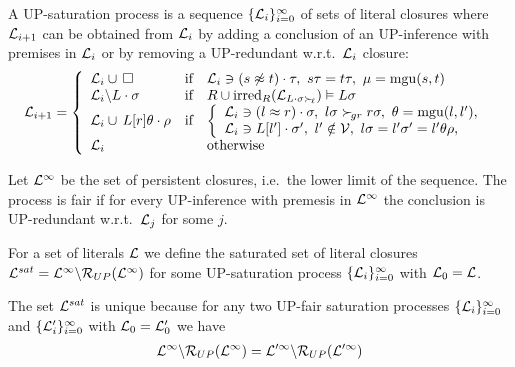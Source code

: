 \begin{definition}
    A UP-{\myem saturation process} is
    a sequence \( \{ \mathcal{L}_i \}_{i=0}^\infty \)
    of sets of literal closures where
    \( \mathcal{L}_{i+1} \) can be obtained from
    \( \mathcal{L}_i \)
    by {\myem adding} a conclusion of an UP-inference with premises in $\mathcal{L}_i$
    or by {\myem removing} a UP-redundant w.r.t.~\(\mathcal{L}_i\) closure:
    \begin{gather*}
        \mathcal{L}_{i+1} = \left\{
            \begin{array}{lclc}
                \mathcal{L}_i \cup\,\square
                &\text{if}
                &
                    \mathcal{L}_i\ni(s\not\approx t)\cdot\tau,\ {}
                    s\tau = t\tau,\ {}
                    \mu=\operatorname{mgu}(s,t)
                \\
                \mathcal{L}_i \backslash L\cdot\sigma
                &\text{if}
                &R \cup \operatorname{irred}_R(\mathcal{L}_{L\cdot\sigma\mathrel\succ_{\!\ell}}) \vDash L\sigma
                \\
                \mathcal{L}_i \cup\, L[r]\theta\cdot\rho
                &\text{if}
                &\left\{\begin{array}{l}
                    \mathcal{L}_i\ni(l\approx r)\cdot\sigma,\ {}
                    l\sigma\mathrel\succ_{\!gr} r\sigma,\ {}
                    \theta=\operatorname{mgu}(l,l'),
                    \\
                    \mathcal{L}_i\ni L[l']\cdot\sigma',\ {}
                    l'\notin\mathcal{V},\ {}
                    l\sigma = l'\sigma' = l'\theta\rho,
                \end{array}\right.
                \\
                \mathcal{L}_i
                &&\text{otherwise}
            \end{array}
        \right.
    \end{gather*}

    Let \( \mathcal{L}^\infty \) be the set of persistent closures,
    i.e.~the lower limit of the sequence.
    The process is {\myem fair} if for every UP-inference
    with premesis in \( \mathcal{L}^\infty \) the conclusion is UP-redundant
    w.r.t.~\(\mathcal{L}_j\) for some \(j\).

    For a set of literals \( \mathcal{L} \) we define
    the saturated set of literal closures
    \( \mathcal{L}^{sat} = \mathcal{L}^\infty\backslash\mathcal{R}_{UP}(\mathcal{L}^\infty) \)
    for some UP-saturation process
    \( \{ \mathcal{L}_i\}_{i=0}^\infty \)
    with $\mathcal{L}_0 = \mathcal{L}$.
\end{definition}

\begin{lemma}
    The set \( \mathcal{L}^{sat} \) is unique because
    for any two UP-fair saturation processes
    \(\{ \mathcal{L}_i
        \}_{i=0}^\infty\) and
        \(\{ \mathcal{L}'_i
        \}_{i=0}^\infty\)
        with $\mathcal{L}_0 = \mathcal{L}'_0$ we have
        \begin{gather*}
            \mathcal{L}^\infty \backslash \mathcal{R}_{UP}(\mathcal{L}^\infty)
            =
            \mathcal{L}'^\infty \backslash \mathcal{R}_{UP}(\mathcal{L}'^\infty)
        \end{gather*}
\end{lemma}

